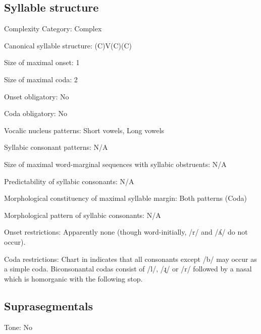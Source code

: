 {\subsection*{Syllable structure}
\begin{appendixdesc}

\item[Complexity Category:] Complex

\item[Canonical syllable structure:] (C)V(C)(C) \citep[94--104]{Bowern2012}

\item[Size of maximal onset:] 1

\item[Size of maximal coda:] 2

\item[Onset obligatory:] No

\item[Coda obligatory:] No

\item[Vocalic nucleus patterns:] Short vowels, Long vowels

\item[Syllabic consonant patterns:] N/A

\item[Size of maximal word-marginal sequences with syllabic obstruents:] N/A

\item[Predictability of syllabic consonants:] N/A

\item[Morphological constituency of maximal syllable margin:] Both patterns (Coda)

\item[Morphological pattern of syllabic consonants:] N/A

\item[Onset restrictions:] Apparently none (though word-initially, /r/ and /ʎ/ do not occur).

\item[Coda restrictions:] Chart in \citet[102]{Bowern2012} indicates that all consonants except /b/ may occur as a simple coda. Biconsonantal codas consist of /l/, /ɻ/ or /r/ followed by a nasal which is homorganic with the following stop.
\end{appendixdesc}
\subsection*{Suprasegmentals}
\begin{appendixdesc}
\item[Tone:] No


\end{appendixdesc}}
